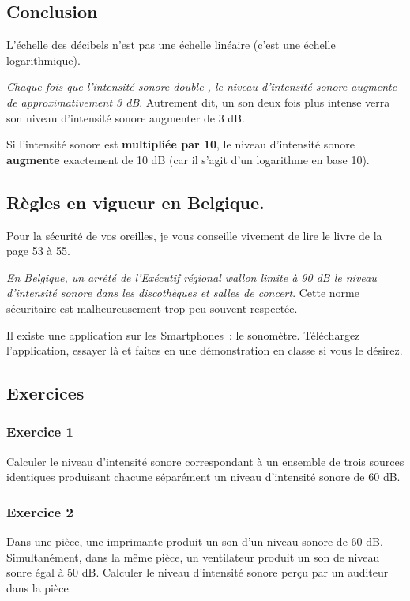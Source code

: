 \subsection{Conclusion}\label{conclusion}

L'échelle des décibels n'est pas une échelle linéaire (c'est une échelle
logarithmique).

\emph{Chaque fois que l'intensité sonore double , le niveau
d'intensité sonore augmente de approximativement 3 dB}. Autrement dit,
un son deux fois plus intense verra son niveau d'intensité sonore
augmenter de 3 dB.

Si l'intensité sonore est \textbf{multipliée par 10}, le niveau
d'intensité sonore \textbf{augmente} exactement de 10 dB (car il s'agit
d'un logarithme en base 10).

\subsection{Règles
en vigueur en Belgique. }

Pour la sécurité de vos oreilles, je vous conseille vivement de lire
le livre de la page 53 à 55.

\emph{En Belgique, un arrêté de l'Exécutif régional wallon
limite à 90 dB le niveau d'intensité sonore dans les discothèques et
salles de concert}. Cette norme sécuritaire est malheureusement trop
peu souvent respectée.

Il existe une application sur les Smartphones~: le sonomètre.
Téléchargez l'application, essayer là et faites en une démonstration en classe si vous le désirez.

\subsection{Exercices}

\subsubsection*{Exercice 1}
 Calculer le niveau d'intensité sonore correspondant à un ensemble de
trois sources identiques produisant chacune séparément un niveau
d'intensité sonore de 60 dB.

\subsubsection*{Exercice 2}

Dans une pièce, une imprimante produit un son d'un niveau sonore de
60 dB. Simultanément, dans la même pièce, un ventilateur produit un son
de niveau sonre égal à 50 dB. Calculer le niveau d'intensité sonore
perçu par un auditeur dans la pièce.

